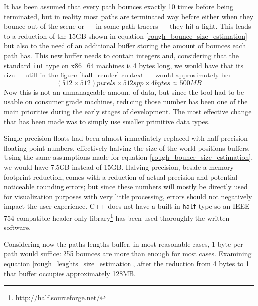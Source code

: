 It has been assumed that every path bounces exactly 10 times before being terminated, but in reality most paths are terminated way before either when they bounce out of the scene or --- in some path tracers --- they hit a light. This leads to a reduction of the 15GB shown in equation \ref{rough_bounce_size_estimation} but also to the need of an additional buffer storing the amount of bounces each path has. This new buffer needs to contain integers and, considering that the standard \texttt{int} type on x86\_64 machines is 4 bytes long, we would have that its size --- still in the figure \ref{hall_render} context --- would approximately be:
\begin{equation}
	\label{rough_lenghts_size_estimation}
	(512 \times 512) pixels \times 512 spp \times 4 bytes \approx 500MB
\end{equation}
Now this is not an unmanageable amount of data, but since the tool had to be usable on consumer grade machines, reducing those number has been one of the main priorities during the early stages of development. The most effective change that has been made was to simply use smaller primitive data types. 

Single precision floats had been almost immediately replaced with half-precision floating point numbers, effectively halving the size of the world positions buffers. Using the same assumptions made for equation \ref{rough_bounce_size_estimation}, we would have 7.5GB instead of 15GB.
Halving precision, beside a memory footprint reduction, comes with a reduction of actual precision and potential noticeable rounding errors; but since these numbers will mostly be directly used for visualization purposes with very little processing, errors should not negatively impact the user experience. C++ does not have a built-in \texttt{half} type so an IEEE 754 compatible header only library\footnote{\url{http://half.sourceforge.net/}} has been used thoroughly the written software.

Considering now the paths lengths buffer, in most reasonable cases, 1 byte per path would suffice: 255 bounces are more than enough for most cases. Examining equation \ref{rough_lenghts_size_estimation}, after the reduction from 4 bytes to 1 that buffer occupies approximately 128MB.